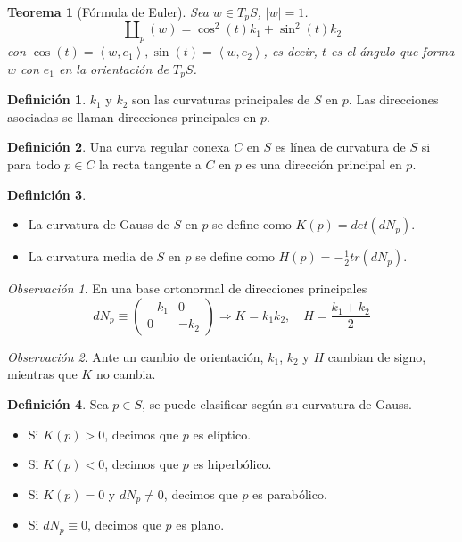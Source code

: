 \documentclass{report}
\newtheorem{theorem}{Teorema}[chapter]
\theoremstyle{remark}
\newtheorem*{remark}{Observación}
\theoremstyle{remark}
\theoremstyle{definition}
\newtheorem{definition}{Definición}[chapter]
\theoremstyle{definition}
\theoremstyle{definition}
\begin{document}
\begin{theorem}[Fórmula de Euler]
    Sea $w \in T_pS$, $|w| = 1$.
    $$\amalg_p(w) = \cos^2(t) k_1 + \sin^2(t) k_2$$
    con $\cos(t) = \left\langle w, e_1 \right\rangle, \sin(t) = \left\langle w, e_2 \right\rangle$, es decir, $t$ es el ángulo que forma $w$ con $e_1$ en la orientación de $T_pS$.
\end{theorem}

\begin{definition}
    $k_1$ y $k_2$ son las curvaturas principales de $S$ en $p$.
    Las direcciones asociadas se llaman direcciones principales en $p$.
\end{definition}

\begin{definition}
    Una curva regular conexa $C$ en $S$ es línea de curvatura de $S$ si para todo $p \in C$ la recta tangente a $C$ en $p$ es una dirección principal en $p$.
\end{definition}

\begin{definition}
    \hfill
    \begin{itemize}
        \item La curvatura de Gauss de $S$ en $p$ se define como $K(p) = det(dN_p)$.
        \item La curvatura media de $S$ en $p$ se define como $H(p) = -\frac{1}{2} tr(dN_p)$.
    \end{itemize}
\end{definition}

\begin{remark}
    En una base ortonormal de direcciones principales
    $$dN_p \equiv
        \begin{pmatrix}
            -k_1 & 0    \\
            0    & -k_2
        \end{pmatrix} \Rightarrow
        K = k_1 k_2, \quad H = \frac{k_1+k_2}{2}$$
\end{remark}

\begin{remark}
    Ante un cambio de orientación, $k_1$, $k_2$ y $H$ cambian de signo, mientras que $K$ no cambia.
\end{remark}

\begin{definition}
    Sea $p \in S$, se puede clasificar según su curvatura de Gauss.
    \begin{itemize}
        \item Si $K(p) > 0$, decimos que $p$ es elíptico.
        \item Si $K(p) < 0$, decimos que $p$ es hiperbólico.
        \item Si $K(p) = 0$ y $dN_p \neq 0$, decimos que $p$ es parabólico.
        \item Si $dN_p \equiv 0$, decimos que $p$ es plano.
    \end{itemize}
\end{definition}
\end{document}
